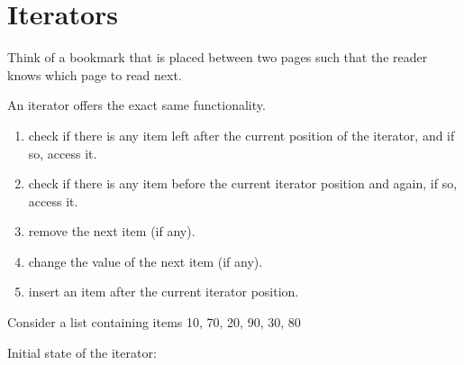 \section{Iterators}

Think of a bookmark that is placed between two pages such that the reader knows which page to read next.

An iterator offers the exact same functionality. 

\begin{enumerate}
  \item check if there is any item left after the current position of the iterator, and if so, access it. 
  \item check if there is any item before the current iterator position and again, if so, access it. 
  \item remove the next item (if any).
  \item change the value of the next item (if any).
  \item insert an item after the current iterator position.
\end{enumerate}

\vskip 1mm

Consider a list containing items 10, 70, 20, 90, 30, 80
\vskip 1mm

\bgroup \tikzset{png export}  \egroup

\newpage

Initial state of the iterator:
\vskip 1mm

\bgroup \tikzset{png export}  \egroup


